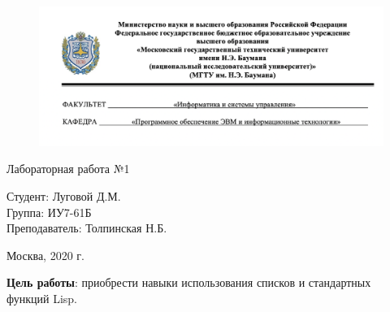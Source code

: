 


	
\begin{figure}[h!]
	\begin{center}
		{\includegraphics[width = \textwidth]{titul.png}}
	\end{center}
\end{figure}

\vspace*{20mm}

\huge
\begin{center}
	Лабораторная работа №1
\end{center}


\vspace*{50mm}

\large
\begin{flushleft}
	Студент: Луговой Д.М. \\
	Группа: ИУ7-61Б \\
	Преподаватель: Толпинская Н.Б.
\end{flushleft}

\vspace*{60mm}

\large
\begin{center}
	Москва, 2020 г.
\end{center}

\thispagestyle{empty}

\newpage
\vspace*{10mm}
\textbf{Цель работы}: приобрести навыки использования списков и стандартных функций Lisp.\\


